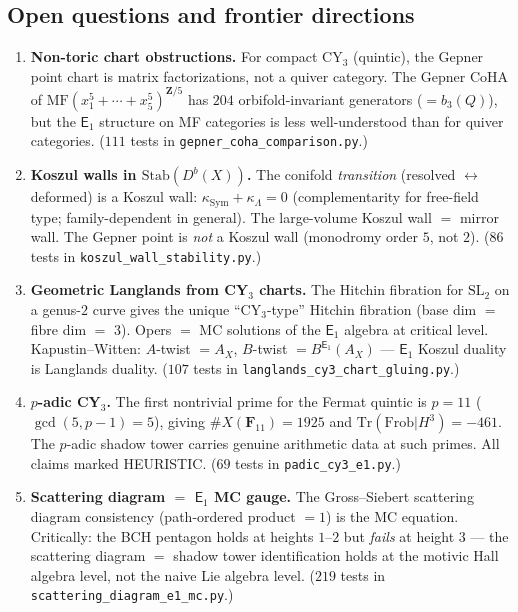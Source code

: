 \documentclass[11pt]{article}
\newcommand{\Eone}{\mathsf{E}_1}
\begin{document}
\subsection{Open questions and frontier directions}

\begin{enumerate}
 \item \textbf{Non-toric chart obstructions.} For compact CY$_3$ (quintic), the Gepner point chart is matrix factorizations, not a quiver category. The Gepner CoHA of $\mathrm{MF}(x_1^5 + \cdots + x_5^5)^{\mathbf{Z}/5}$ has $204$ orbifold-invariant generators ($= b_3(Q)$), but the $\Eone$ structure on MF categories is less well-understood than for quiver categories. ($111$ tests in \texttt{gepner\_coha\_comparison.py}.)

 \item \textbf{Koszul walls in $\mathrm{Stab}(D^b(X))$.} The conifold \emph{transition} (resolved $\leftrightarrow$ deformed) is a Koszul wall: $\kappa_{\mathrm{Sym}} + \kappa_{\Lambda} = 0$ (complementarity for free-field type; family-dependent in general). The large-volume Koszul wall $=$ mirror wall. The Gepner point is \emph{not} a Koszul wall (monodromy order $5$, not $2$). ($86$ tests in \texttt{koszul\_wall\_stability.py}.)

 \item \textbf{Geometric Langlands from CY$_3$ charts.} The Hitchin fibration for $\mathrm{SL}_2$ on a genus-$2$ curve gives the unique ``CY$_3$-type'' Hitchin fibration (base dim $=$ fibre dim $=$ $3$). Opers $=$ MC solutions of the $\Eone$ algebra at critical level. Kapustin--Witten: $A$-twist $= A_X$, $B$-twist $= B^{\Eone}(A_X)$ --- $\Eone$ Koszul duality is Langlands duality. ($107$ tests in \texttt{langlands\_cy3\_chart\_gluing.py}.)

 \item \textbf{$p$-adic CY$_3$.} The first nontrivial prime for the Fermat quintic is $p = 11$ ($\gcd(5, p-1) = 5$), giving $\#X(\mathbf{F}_{11}) = 1925$ and $\mathrm{Tr}(\mathrm{Frob}|H^3) = -461$. The $p$-adic shadow tower carries genuine arithmetic data at such primes. All claims marked HEURISTIC. ($69$ tests in \texttt{padic\_cy3\_e1.py}.)

 \item \textbf{Scattering diagram $=$ $\Eone$ MC gauge.} The Gross--Siebert scattering diagram consistency (path-ordered product $= 1$) is the MC equation. Critically: the BCH pentagon holds at heights $1$--$2$ but \emph{fails} at height $3$ --- the scattering diagram $=$ shadow tower identification holds at the motivic Hall algebra level, not the naive Lie algebra level. ($219$ tests in \texttt{scattering\_diagram\_e1\_mc.py}.)


\end{enumerate}
\end{document}
